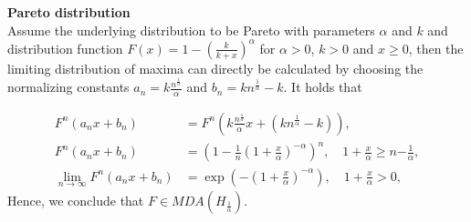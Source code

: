 \documentclass[a4paper,12pt]{article}
\theoremstyle{plain}
\begin{document}
\noindent \textbf{Pareto distribution}\\
Assume the underlying distribution to be Pareto with parameters $\alpha$ and $k$ and distribution function $F\left(x\right)=1-\left(\frac{k}{k+x}\right)^\alpha$ for $\alpha>0$, $k>0$ and $x \geq 0$, then the limiting distribution of maxima can directly be calculated by choosing the normalizing constants $a_n = k\frac{n^{\frac{1}{\alpha}}}{\alpha}$ and $b_n=kn^{\frac{1}{\alpha}} - k$. It holds that

\begin{equation}
    \begin{split}
        F^n\left(a_nx+b_n\right) &= F^n\left(k\frac{n^{\frac{1}{\alpha}}}{\alpha}x + \left(kn^{\frac{1}{\alpha}} - k\right)\right),\\
        F^n\left(a_nx+b_n\right) &= \left(1 - \frac{1}{n}\left(1+\frac{x}{\alpha}\right)^{-\alpha}\right)^n, \quad 1+\frac{x}{\alpha}\geq n{-\frac{1}{\alpha}},\\
        \lim_{n\to\infty}F^n\left(a_nx+b_n\right) &= \exp{\left(-\left(1+\frac{x}{\alpha}\right)^{-\alpha}\right)}, \quad 1+\frac{x}{\alpha}>0,
    \end{split}
\end{equation}
Hence, we conclude that $F\in MDA\left(H_{\frac{1}{\alpha}}\right)$.
\end{document}
